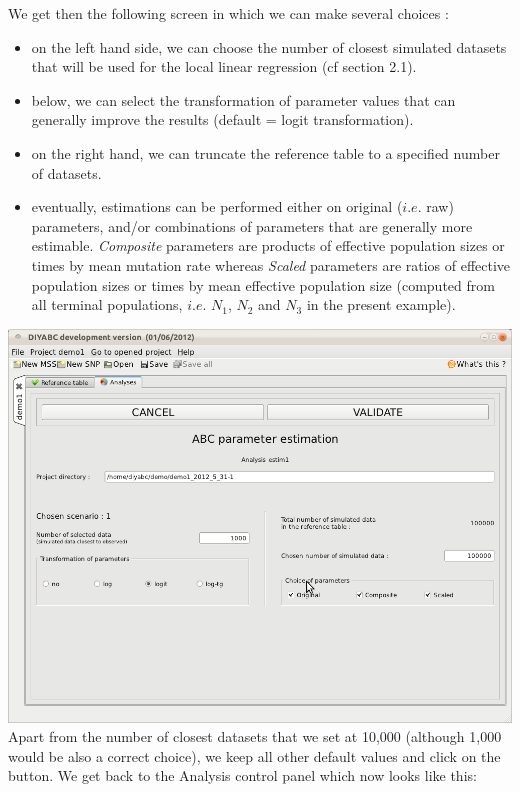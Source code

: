 We get then the following screen in which we can make several choices :
\begin{itemize}
 \item on the left hand side, we can choose the number of closest simulated datasets that will be used for the local linear regression (cf section 2.1).
 \item below, we can select the transformation of parameter values that can generally improve the results (default = logit transformation).
 \item on the right hand, we can truncate the reference table to a specified number of datasets.
 \item eventually, estimations can be performed either on original ($i.e.$ raw) parameters, and/or combinations of parameters that are generally more estimable. \emph{Composite} parameters are products of effective population sizes or times by mean mutation rate whereas \emph{Scaled} parameters are ratios of effective population sizes or times by mean effective population size (computed from all terminal populations, $i.e.$ $N_1$, $N_2$ and $N_3$ in the present example). 
\end{itemize}

\includegraphics[scale=0.35]{gui_pictures/Capture-DIYABC-36.png} \\
 
Apart from the number of closest datasets that we set at 10,000 (although 1,000 would be also a correct choice), we keep all other default values and click on the  button. We get back to the Analysis control panel which now looks like this:\\

